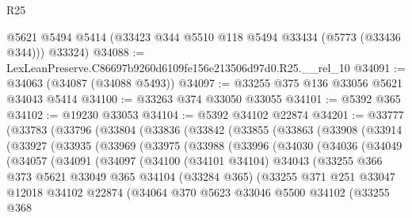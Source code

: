 \begin{lexlean}{R25}
\begin{coremodule}
      @5621
      @5494
      @5414
      (@33423 @344 @5510 @118 @5494 @33434 (@5773 (@33436 @344)))
      @33324)
@34088 := LexLeanPreserve.C86697b9260d6109fe156e213506d97d0.R25.__rel_10
@34091 := @34063 (@34087 (@34088 @5493))
@34097 := @33255 @375 @136 @33056 @5621 @34043 @5414
@34100 := @33263 @374 @33050 @33055
@34101 := @5392 @365
@34102 := @19230 @33053
@34104 := @5392 @34102 @22874
@34201 := @33777
    (@33783
      (@33796
        (@33804
          (@33836
            (@33842
              (@33855
                (@33863
                  (@33908
                    (@33914
                      (@33927
                        (@33935
                          (@33969
                            (@33975
                              (@33988
                                (@33996
                                  (@34030
                                    (@34036
                                      (@34049
                                        (@34057
                                          (@34091
                                            (@34097
                                              (@34100
                                                (@34101 @34104)
                                                @34043
                                                (@33255
                                                  @366
                                                  @373
                                                  @5621
                                                  @33049
                                                  @365
                                                  @34104
                                                  (@33284 @365)
                                                  (@33255
                                                    @371
                                                    @251
                                                    @33047
                                                    @12018
                                                    @34102
                                                    @22874
                                                    (@34064
                                                      @370
                                                      @5623
                                                      @33046
                                                      @5500
                                                      @34102
                                                      (@33255
                                                        @368

\end{coremodule}
\end{lexlean}
